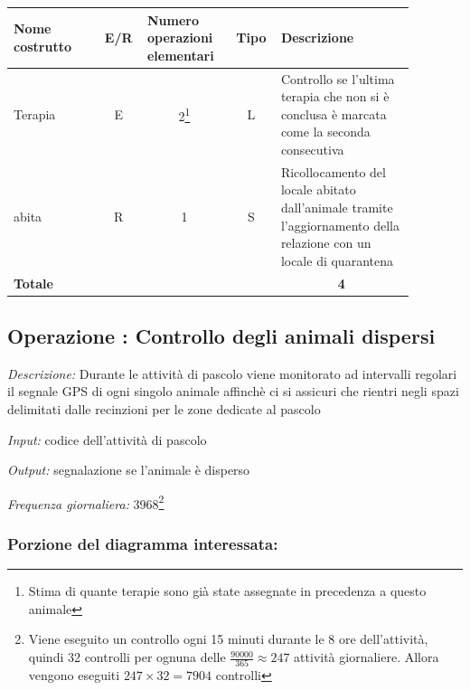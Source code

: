 \documentclass[12pt,a4paper]{article}
\begin{document}
\begin{center}\setlength{\extrarowheight}{1.5pt}\begin{longtable}{|p{0.2\linewidth}|p{0.1\linewidth}|p{0.175\linewidth}|p{0.1\linewidth}|p{0.3\linewidth}|}\hline \textbf{Nome costrutto}   & \multicolumn{1}{|c|}{\textbf{E/R}} & \textbf{Numero operazioni elementari} & \multicolumn{1}{|c|}{\textbf{Tipo}} & \textbf{Descrizione}\\ 
\hline
Terapia
 & 
\multicolumn{1}{|c|}{E}
 & 
\multicolumn{1}{|c|}{2\footnote{Stima di quante terapie sono già state assegnate in precedenza a questo animale}}
 & 
\multicolumn{1}{|c|}{L}
 & 
Controllo se l'ultima terapia che non si è conclusa è marcata come la seconda consecutiva
\\
\hline
abita
 & 
\multicolumn{1}{|c|}{R}
 & 
\multicolumn{1}{|c|}{1}
 & 
\multicolumn{1}{|c|}{S}
 & 
Ricollocamento del locale abitato dall'animale tramite l'aggiornamento della relazione con un locale di quarantena
\\
\hline
\multicolumn{4}{|l|}{\textbf{Totale}}
 & 
\multicolumn{1}{|c|}{\textbf{4}}
\\
\hline
\end{longtable}\end{center}

\subsection*{Operazione \thecounterAccessi{}: Controllo degli animali dispersi}
\noindent\textit{Descrizione:} Durante le attività di pascolo viene monitorato ad intervalli regolari il segnale GPS di ogni singolo animale affinchè ci si assicuri che rientri negli spazi delimitati dalle recinzioni per le zone dedicate al pascolo

\noindent\textit{Input:} codice dell'attività di pascolo

\noindent\textit{Output:} segnalazione se l'animale è disperso

\noindent\textit{Frequenza giornaliera:} 3968\footnote{Viene eseguito un controllo ogni 15 minuti durante le 8 ore dell'attività, quindi 32 controlli per ognuna delle $\frac{90000}{365}\approx 247$ attività giornaliere. Allora vengono eseguiti $247\times 32 = 7904$ controlli}

\subsubsection*{Porzione del diagramma interessata:}
\end{document}
